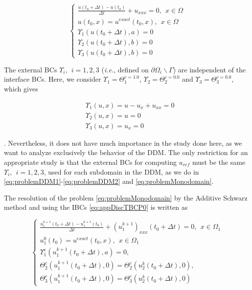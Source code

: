 \begin{equation}
	\label{eq:problemMonodomain}
	\begin{cases}
	\frac{u(t_0+\Delta t) - u(t_0)}{\Delta t} + u_{xxx} = 0, \ \ x \in \Omega\\
	u(t_0,x) = u^{exact}(t_0,x) , \ \ x \in \Omega \\ 
	\Upsilon_1(u(t_0 + \Delta t),a) = 0\\
	\Upsilon_2(u(t_0 + \Delta t),b) = 0\\
	\Upsilon_3(u(t_0 + \Delta t),b) = 0
	\end{cases}
\end{equation}

\indent The external BCs $ \Upsilon_i, \ \ i=1,2,3$ (\emph{i.e.}, defined on $\partial \Omega_i \backslash \Gamma$) are independent of the interface BCs. Here, we consider $\Upsilon_1 = \Theta_1^{c = 1.0}$, $\Upsilon_2 = \Theta_2^{c = 0.0}$ and $\Upsilon_3 = \Theta_3^{c = 0.0}$, which gives

\begin{align*}
	&\Upsilon_1(u,x) = u - u_x + u_{xx} = 0\\
	&\Upsilon_2(u,x) = u = 0\\
	&\Upsilon_3(u,x) = u_x = 0
\end{align*}

\indent {} . Nevertheless, it does not have much importance in the study done here, as we want to analyze exclusively the behavior of the DDM. The only restriction for an appropriate study is that the external BCs for computing $u_{ref}$ must be the same $\Upsilon_i, \ \ i=1,2,3$, used for each subdomain in the DDM, as we do in \eqref{eq:problemDDM1}-\eqref{eq:problemDDM2} and \eqref{eq:problemMonodomain}.

\indent The resolution of the problem \eqref{eq:problemMonodomain} by the Additive Schwarz method and using the IBCs \eqref{eq:appDiscTBCP0} is written as

\begin{equation}
    \label{eq:problemDDM1}
    \begin{cases}
        \frac{u_1^{k+1}(t_0+\Delta t) - u_1^{k+1}(t_0)}{\Delta t} + (u_1^{k+1})_{xxx}(t_0+\Delta t) = 0 , \ \ x \in \Omega_1\\
        u_1^{0}(t_0) = u^{exact}(t_0,x) , \ \ x \in \Omega_1 \\
        \Upsilon_1^{c}(u_1^{k+1}(t_0+\Delta t),a) = 0, \\ 
        \Theta_2^{c}(u_1^{k+1}(t_0+\Delta t),0) = \Theta_2^{c}(u_2^{k}(t_0+\Delta t),0) , \\
        \Theta_3^{c}(u_1^{k+1}(t_0+\Delta t),0) = \Theta_3^{c}(u_2^{k}(t_0+\Delta t),0)
     \end{cases}
\end{equation}

